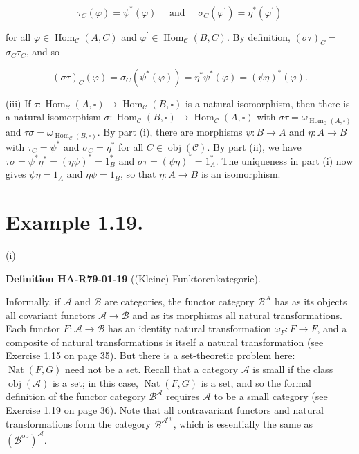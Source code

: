\documentclass[10pt, letterpaper]{article}
\newcommand{\CustomHeading}[3]{%
  \par\medskip\noindent%
  \textbf{#1 #2} \textnormal{(#3)}.\enskip%
}
\newenvironment{DEF}[2]{\begin{unitbox}\CustomHeading{Definition}{#1}{#2}}{\end{unitbox}}
\begin{document}
$$
\tau_{C}(\varphi)=\psi^{*}(\varphi) \quad \text { and } \quad \sigma_{C}\left(\varphi^{\prime}\right)=\eta^{*}\left(\varphi^{\prime}\right)
$$

for all $\varphi \in \operatorname{Hom}_{\mathcal{C}}(A, C)$ and $\varphi^{\prime} \in \operatorname{Hom}_{\mathcal{C}}(B, C)$. By definition, $(\sigma \tau)_{C}=$ $\sigma_{C} \tau_{C}$, and so

$$
(\sigma \tau)_{C}(\varphi)=\sigma_{C}\left(\psi^{*}(\varphi)\right)=\eta^{*} \psi^{*}(\varphi)=(\psi \eta)^{*}(\varphi) .
$$

(iii) If $\tau: \operatorname{Hom}_{\mathcal{C}}(A, \square) \rightarrow \operatorname{Hom}_{\mathcal{C}}(B, \square)$ is a natural isomorphism, then there is a natural isomorphism $\sigma: \operatorname{Hom}_{\mathcal{C}}(B, \square) \rightarrow \operatorname{Hom}_{\mathcal{C}}(A, \square)$ with $\sigma \tau=\omega_{\operatorname{Hom}_{\mathcal{C}}(A, \square)}$ and $\tau \sigma=\omega_{\operatorname{Hom}_{\mathcal{C}}(B, \square)}$. By part (i), there are morphisms $\psi: B \rightarrow A$ and $\eta: A \rightarrow B$ with $\tau_{C}=\psi^{*}$ and $\sigma_{C}=\eta^{*}$ for all $C \in \operatorname{obj}(\mathcal{C})$. By part (ii), we have $\tau \sigma=\psi^{*} \eta^{*}=(\eta \psi)^{*}=1_{B}^{*}$ and $\sigma \tau=(\psi \eta)^{*}=1_{A}^{*}$. The uniqueness in part (i) now gives $\psi \eta=1_{A}$ and $\eta \psi=1_{B}$, so that $\eta: A \rightarrow B$ is an isomorphism.

\section*{Example 1.19.}
(i) 


\begin{DEF}{HA-R79-01-19}{(Kleine) Funktorenkategorie}
Informally, if $\mathcal{A}$ and $\mathcal{B}$ are categories, the functor category $\mathcal{B}^{\mathcal{A}}$ has as its objects all covariant functors $\mathcal{A} \rightarrow \mathcal{B}$ and as its morphisms all natural transformations. Each functor $F: \mathcal{A} \rightarrow \mathcal{B}$ has an identity natural transformation $\omega_{F}: F \rightarrow F$, and a composite of natural transformations is itself a natural transformation (see Exercise 1.15 on page 35). But there is a set-theoretic problem here: $\operatorname{Nat}(F, G)$ need not be a set. Recall that a category $\mathcal{A}$ is small if the class $\operatorname{obj}(\mathcal{A})$ is a set; in this case, $\operatorname{Nat}(F, G)$ is a set, and so the formal definition of the functor category $\mathcal{B}^{\mathcal{A}}$ requires $\mathcal{A}$ to be a small category (see Exercise 1.19 on page 36). Note that all contravariant functors and natural transformations form the category $\mathcal{B}^{\mathcal{A}^{\mathrm{op}}}$, which is essentially the same as $\left(\mathcal{B}^{\mathrm{op}}\right)^{\mathcal{A}}$.
\end{DEF}
\end{document}
